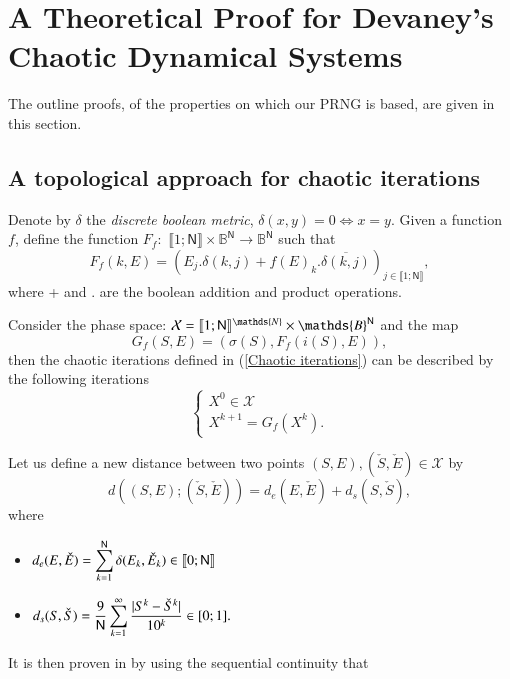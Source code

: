\section{A Theoretical Proof for Devaney's Chaotic Dynamical Systems}
\label{A theoretical proof for Devaney's chaotic dynamical systems}
The outline proofs, of the properties on which our PRNG is based, are given in this section. 

\subsection{A topological approach for chaotic iterations}

Denote by $\delta $ the \emph{discrete boolean metric}, $\delta
(x,y)=0\Leftrightarrow x=y.$ Given a function $f$, define the function $%
F_{f}:$ $\llbracket1;\mathsf{N}\rrbracket\times \mathds{B}^{\mathsf{N}%
}\longrightarrow \mathds{B}^{\mathsf{N}}$ such that $$F_{f}(k,E)=\left(
E_{j}.\delta (k,j)+f(E)_{k}.\overline{\delta (k,j)}\right) _{j\in \llbracket%
1;\mathsf{N}\rrbracket},$$ where + and . are the boolean addition and product operations.

Consider the phase space: $\mathcal{X}=\llbracket1;\mathsf{N}\rrbracket^{%
\mathds{N}}\times \mathds{B}^{\mathsf{N}}$ and the map $$G_{f}\left( S,E\right) =\left( \sigma
(S),F_{f}(i(S),E)\right) ,$$ then the chaotic iterations defined in (\ref{Chaotic iterations}) can be described by the following iterations \cite{guyeux09}
\[
\left\{
\begin{array}{l}
X^{0}\in \mathcal{X} \\
X^{k+1}=G_{f}(X^{k}).%
\end{array}%
\right.
\]

Let us define a new distance between two points $(S,E),(\check{S},\check{E})\in
\mathcal{X}$ by $$d((S,E);(\check{S},\check{E}))=d_{e}(E,\check{E})+d_{s}(S,%
\check{S}),$$ where
\begin{itemize}
\item $\displaystyle{d_{e}(E,\check{E})}=\displaystyle{%
\sum_{k=1}^{\mathsf{N}}\delta (E_{k},\check{E}_{k})} \in \llbracket 0 ; \mathsf{N} \rrbracket$ \\
\item $\displaystyle{%
d_{s}(S,\check{S})}=\displaystyle{\dfrac{9}{\mathsf{N}}\sum_{k=1}^{\infty }%
\dfrac{|S^{k}-\check{S}^{k}|}{10^{k}}} \in [0 ; 1].$
\end{itemize}

\medskip

It is then proven in \cite{guyeux09} by using the sequential continuity that



